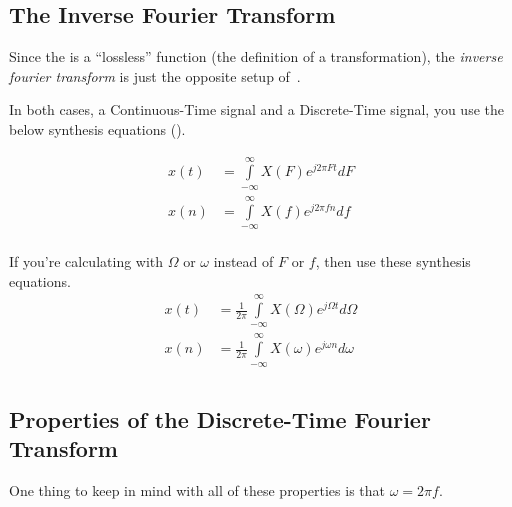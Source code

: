 \subsection{The Inverse Fourier Transform}\label{subsec:InverseFourierTransform}
\begin{definition}\label{def:InverseFourierTransform}
  Since the  is a ``lossless'' function (the definition of a transformation), the \emph{inverse fourier transform} is just the opposite setup of~.

  In both cases, a Continuous-Time signal and a Discrete-Time signal, you use the below synthesis equations ().
  
  \begin{equation}\label{eq:InverseFourierTransform-Frequency}
    \begin{aligned}
      x(t) &= \int\limits_{-\infty}^{\infty} X(F) e^{j 2\pi Ft} dF \\
      x(n) &= \int\limits_{-\infty}^{\infty} X(f) e^{j 2\pi fn} df \\
    \end{aligned}
  \end{equation}

  If you're calculating with $\Omega$ or $\omega$ instead of $F$ or $f$, then use these synthesis equations.
  \begin{equation}\label{eq:InverseFourierTransform-Omega}
    \begin{aligned}
      x(t) &= \frac{1}{2\pi} \int\limits_{-\infty}^{\infty} X(\Omega) e^{j \Omega t} d\Omega \\
      x(n) &= \frac{1}{2\pi} \int\limits_{-\infty}^{\infty} X(\omega) e^{j \omega n} d\omega \\
    \end{aligned}
  \end{equation}
\end{definition}

\subsection{Properties of the Discrete-Time Fourier Transform}\label{subsec:FourierTransformProperties-Discrete}
One thing to keep in mind with all of these properties is that $\omega = 2 \pi f$.

